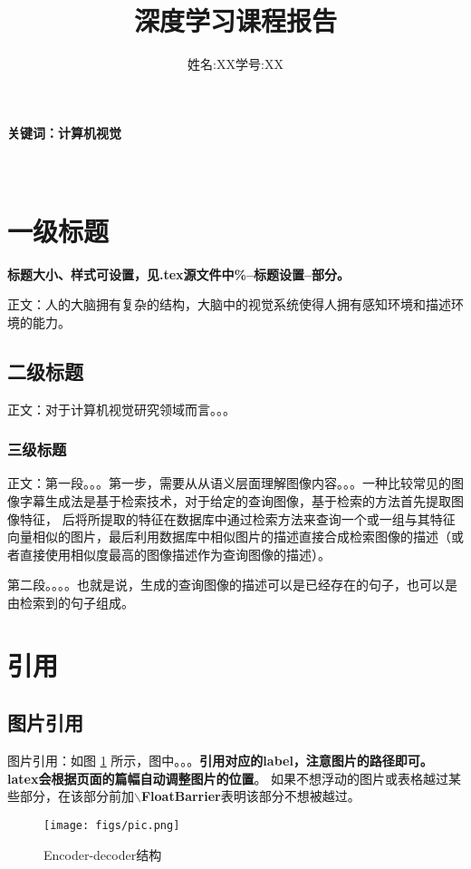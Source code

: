 \documentclass[UTF8,12pt]{article} %
\newcommand*{\kaiti}{\CJKfamily{zhkai}}  %
\begin{document}
\title{\bf{\kaiti 深度学习课程报告}}
\author{姓名:XX\hspace{1cm}学号:XX}
\date{}
\maketitle

\paragraph{\bf{ \kaiti 关键词：计算机视觉}}
\paragraph{\\}

\section{一级标题}
\textbf{标题大小、样式可设置，见.tex源文件中\%--标题设置--部分。}

  正文：人的大脑拥有复杂的结构，大脑中的视觉系统使得人拥有感知环境和描述环境的能力。

\subsection{二级标题}
正文：对于计算机视觉研究领域而言。。。
\subsubsection{三级标题}
正文：第一段。。。第一步，需要从从语义层面理解图像内容。。。一种比较常见的图像字幕生成法是基于检索技术，对于给定的查询图像，基于检索的方法首先提取图像特征，
后将所提取的特征在数据库中通过检索方法来查询一个或一组与其特征向量相似的图片，最后利用数据库中相似图片的描述直接合成检索图像的描述（或者直接使用相似度最高的图像描述作为查询图像的描述）。
  
  第二段。。。。也就是说，生成的查询图像的描述可以是已经存在的句子，也可以是由检索到的句子组成。

\section{引用}
\subsection{图片引用}
图片引用：如图 \ref{fig:enc-dec} 所示，图中。。。\textbf{引用对应的label，注意图片的路径即可。}
\textbf{latex会根据页面的篇幅自动调整图片的位置}。
如果不想浮动的图片或表格越过某些部分，在该部分前加\textbf{$\backslash$FloatBarrier}表明该部分不想被越过。
\begin{figure}[ht]
  \centering
  \texttt{[image: figs/pic.png]}
  \caption{Encoder-decoder结构}
  \label{fig:enc-dec}
\end{figure}
\end{document}
